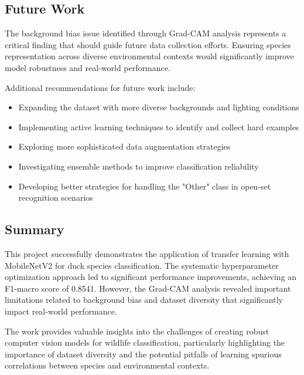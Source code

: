\documentclass[12pt,a4paper]{article}
\begin{document}
\subsection{Future Work}

The background bias issue identified through Grad-CAM analysis represents a critical finding that should guide future data collection efforts. Ensuring species representation across diverse environmental contexts would significantly improve model robustness and real-world performance.

Additional recommendations for future work include:

\begin{itemize}
    \item Expanding the dataset with more diverse backgrounds and lighting conditions
    \item Implementing active learning techniques to identify and collect hard examples
    \item Exploring more sophisticated data augmentation strategies
    \item Investigating ensemble methods to improve classification reliability
    \item Developing better strategies for handling the "Other" class in open-set recognition scenarios
\end{itemize}

\subsection{Summary}

This project successfully demonstrates the application of transfer learning with MobileNetV2 for duck species classification. The systematic hyperparameter optimization approach led to significant performance improvements, achieving an F1-macro score of 0.8541. However, the Grad-CAM analysis revealed important limitations related to background bias and dataset diversity that significantly impact real-world performance.

The work provides valuable insights into the challenges of creating robust computer vision models for wildlife classification, particularly highlighting the importance of dataset diversity and the potential pitfalls of learning spurious correlations between species and environmental contexts.
\end{document}
